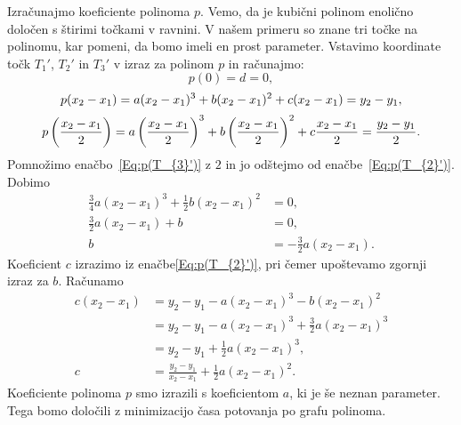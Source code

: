 \documentclass[a4paper]{article}
\begin{document}
Izračunajmo koeficiente polinoma $p$. Vemo, da je kubični polinom enolično določen s štirimi točkami v ravnini. V našem primeru so znane tri točke na polinomu, kar pomeni, da bomo imeli en prost parameter. Vstavimo koordinate točk $T_{1}'$, $T_{2}'$ in $T_{3}'$ v izraz za polinom $p$ in računajmo:
\begin{equation}
p(0) = d = 0,
\end{equation}
%
\begin{equation}
\label{Eq:p(T_{2}')}
p(x_2-x_1) = a(x_2-x_1)^3+b(x_2-x_1)^2+c(x_2-x_1) = y_2-y_1,
\end{equation}
%
\begin{equation}
\label{Eq:p(T_{3}')}
p \left(\frac{x_2-x_1}{2} \right) = a \left(\frac{x_2-x_1}{2} \right)^3+b \left(\frac{x_2-x_1}{2} \right)^2+c \frac{x_2-x_1}{2} = \frac{y_2-y_1}{2}.
\end{equation}
%
Pomnožimo enačbo~\eqref{Eq:p(T_{3}')} z $2$ in jo odštejmo od enačbe~\eqref{Eq:p(T_{2}')}. Dobimo
\begin{align}
\frac{3}{4} a(x_2-x_1)^3 + \frac{1}{2} b(x_2-x_1)^2 &= 0, \nonumber \\
\frac{3}{2} a(x_2-x_1) + b &= 0, \nonumber \\
b &= -\frac{3}{2} a(x_2-x_1).
\end{align}
%
Koeficient $c$ izrazimo iz enačbe\eqref{Eq:p(T_{2}')}, pri čemer upoštevamo zgornji izraz za $b$. Računamo
\begin{align}
c(x_2-x_1) &= y_2 - y_1 - a(x_2-x_1)^3 - b(x_2-x_1)^2 \nonumber \\
 &= y_2 - y_1 - a(x_2-x_1)^3 + \frac{3}{2} a(x_2-x_1)^3 \nonumber \\
 &= y_2 - y_1 + \frac{1}{2} a(x_2-x_1)^3, \nonumber \\
c &= \frac{y_2-y_1}{x_2-x_1} + \frac{1}{2} a(x_2-x_1)^2.
\end{align}
%
Koeficiente polinoma $p$ smo izrazili s koeficientom $a$, ki je še neznan parameter. Tega bomo določili z minimizacijo časa potovanja po grafu polinoma.
\end{document}
